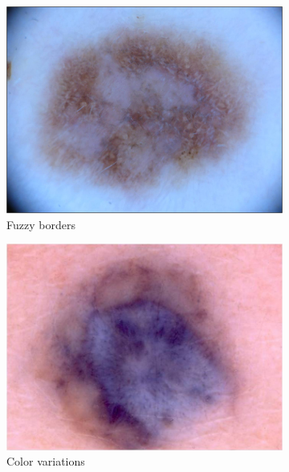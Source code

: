 \documentclass[a4paper,10pt]{article}
\begin{document}
\begin{figure}[h]
	\begin{subfigure}{0.32\linewidth}
		\includegraphics[width=0.99\linewidth]{../results/data_examples/035.jpg} 
		\caption{Fuzzy borders}
		\label{fig:fuzz}
	\end{subfigure}
	\begin{subfigure}{0.32\linewidth}
		\includegraphics[width=0.99\linewidth]{../results/data_examples/235.jpg} 
		\caption{Color variations}
		\label{fig:color-var}
	\end{subfigure}
	\begin{subfigure}{0.32\linewidth}

\end{subfigure}
\end{figure}
\end{document}
